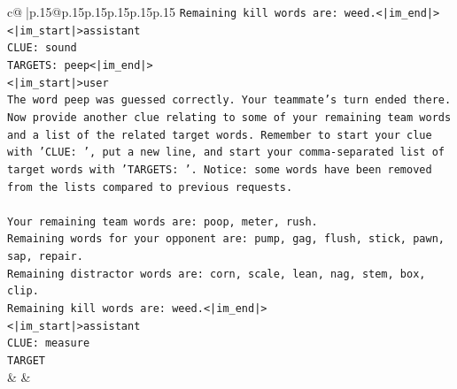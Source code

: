 \documentclass{article}
\begin{document}
{\begin{supertabular}{c@{$\;$}|p{.15\linewidth}@{}p{.15\linewidth}p{.15\linewidth}p{.15\linewidth}p{.15\linewidth}p{.15\linewidth}}
{{{\texttt{Remaining kill words are: weed.<|im\_end|>} \\
\texttt{<|im\_start|>assistant} \\
\texttt{CLUE: sound} \\
\texttt{TARGETS: peep<|im\_end|>} \\
\texttt{<|im\_start|>user} \\
\texttt{The word peep was guessed correctly. Your teammate's turn ended there.} \\
\texttt{Now provide another clue relating to some of your remaining team words and a list of the related target words. Remember to start your clue with 'CLUE: ', put a new line, and start your comma{-}separated list of target words with 'TARGETS: '. Notice: some words have been removed from the lists compared to previous requests.} \\
\\ 
\texttt{Your remaining team words are: poop, meter, rush.} \\
\texttt{Remaining words for your opponent are: pump, gag, flush, stick, pawn, sap, repair.} \\
\texttt{Remaining distractor words are: corn, scale, lean, nag, stem, box, clip.} \\
\texttt{Remaining kill words are: weed.<|im\_end|>} \\
\texttt{<|im\_start|>assistant} \\
\texttt{CLUE: measure} \\
\texttt{TARGET} \\
            }
        }
    }
    & & \\ \\


\end{supertabular}}
\end{document}
